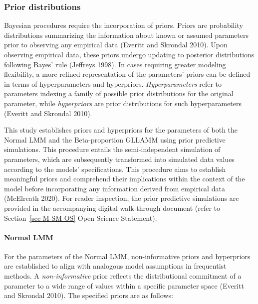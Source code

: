 \documentclass[
sn-apacite
]{sn-jnl}
\let\oldparagraph\paragraph
\renewcommand{\paragraph}[1]{\oldparagraph{#1}\mbox{}}
\begin{document}
\subsubsection{Prior distributions}\label{sec-M-SM-P}

Bayesian procedures require the incorporation of priors. Priors are
probability distributions summarizing the information about known or
assumed parameters prior to observing any empirical data (Everitt and
Skrondal 2010). Upon observing empirical data, these priors undergo
updating to posterior distributions following Bayes' rule (Jeffreys
1998). In cases requiring greater modeling flexibility, a more refined
representation of the parameters' priors can be defined in terms of
hyperparameters and hyperpriors. \emph{Hyperparameters} refer to
parameters indexing a family of possible prior distributions for the
original parameter, while \emph{hyperpriors} are prior distributions for
such hyperparameters (Everitt and Skrondal 2010).

This study establishes priors and hyperpriors for the parameters of both
the Normal LMM and the Beta-proportion GLLAMM using prior predictive
simulations. This procedure entails the semi-independent simulation of
parameters, which are subsequently transformed into simulated data
values according to the models' specifications. This procedure aims to
establish meaningful priors and comprehend their implications within the
context of the model before incorporating any information derived from
empirical data (McElreath 2020). For reader inspection, the prior
predictive simulations are provided in the accompanying digital
walk-through document (refer to Section~\ref{sec-M-SM-OS} Open Science
Statement).

\paragraph{Normal LMM}\label{sec-M-SM-P-NLMM}

For the parameters of the Normal LMM, non-informative priors and
hyperpriors are established to align with analogous model assumptions in
frequentist methods. A \emph{non-informative} prior reflects the
distributional commitment of a parameter to a wide range of values
within a specific parameter space (Everitt and Skrondal 2010). The
specified priors are as follows:
\end{document}
